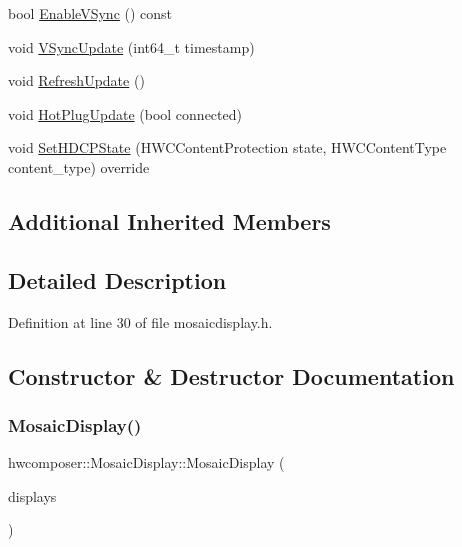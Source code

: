 \begin{DoxyCompactItemize}
\item 
bool \mbox{\hyperlink{classhwcomposer_1_1MosaicDisplay_a9a53f36574c2ed39f589413721b0fafa}{Enable\+V\+Sync}} () const
\item 
void \mbox{\hyperlink{classhwcomposer_1_1MosaicDisplay_ab2d47bd2c1eac196990bb8d7c2f1ecd7}{V\+Sync\+Update}} (int64\+\_\+t timestamp)
\item 
void \mbox{\hyperlink{classhwcomposer_1_1MosaicDisplay_aeb0d37462e1584fa329deaea3d7788e3}{Refresh\+Update}} ()
\item 
void \mbox{\hyperlink{classhwcomposer_1_1MosaicDisplay_af529c96ce14e717b11759fa45648ea68}{Hot\+Plug\+Update}} (bool connected)
\item 
void \mbox{\hyperlink{classhwcomposer_1_1MosaicDisplay_a406e652e251f8f88ef628704a1e57b1f}{Set\+H\+D\+C\+P\+State}} (H\+W\+C\+Content\+Protection state, H\+W\+C\+Content\+Type content\+\_\+type) override
\end{DoxyCompactItemize}
\subsection*{Additional Inherited Members}


\subsection{Detailed Description}


Definition at line 30 of file mosaicdisplay.\+h.



\subsection{Constructor \& Destructor Documentation}
\mbox{\label{classhwcomposer_1_1MosaicDisplay_a55b36338b1f718942c94d309b3ee7138}} 
\subsubsection{\texorpdfstring{Mosaic\+Display()}{MosaicDisplay()}}
{\footnotesize\ttfamily hwcomposer\+::\+Mosaic\+Display\+::\+Mosaic\+Display (\begin{DoxyParamCaption}\item[{const std\+::vector$<$ \mbox{\hyperlink{classhwcomposer_1_1NativeDisplay}{Native\+Display}} $\ast$$>$ \&}]{displays }\end{DoxyParamCaption})}



